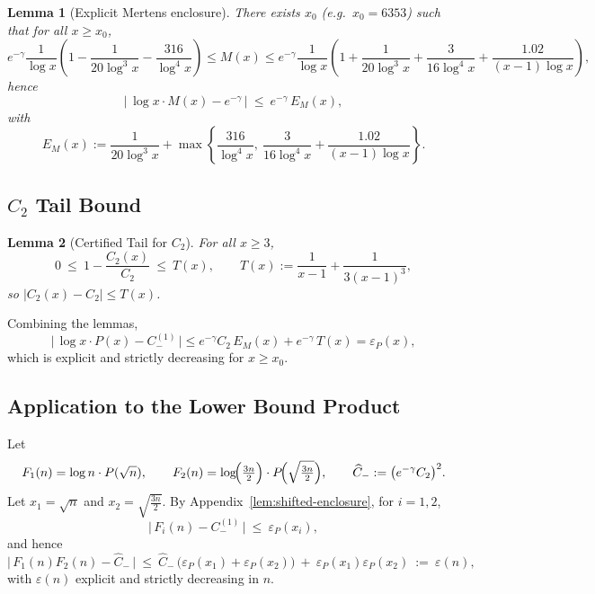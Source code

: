 \documentclass[11pt]{article}
\theoremstyle{inline}
\theoremstyle{break}
\newtheorem{lemma}{Lemma}
\theoremstyle{break}
\theoremstyle{break}
\theoremstyle{break}
\theoremstyle{break}
\theoremstyle{break}
\theoremstyle{break}
\theoremstyle{inline}
\newcommand{\xMertens}{6353} %
\begin{document}
\begin{lemma}[Explicit Mertens enclosure\cite{RosserSchoenfeld1962, Dusart2010}]\label{lem:explicit-mertens}
There exists \( x_0 \) (e.g.\ \( x_0=\xMertens \)) such that for all \( x\ge x_0 \),
\begin{equation}
e^{-\gamma}\frac{1}{\log x}\!\left(1-\frac{1}{20\log^3 x}-\frac{316}{\log^4 x}\right)
\le M(x) \le
e^{-\gamma}\frac{1}{\log x}\!\left(1+\frac{1}{20\log^3 x}+\frac{3}{16\log^4 x}
+\frac{1.02}{(x-1)\log x}\right),
\end{equation}
hence
\begin{equation}
\bigl|\,\log x\cdot M(x)-e^{-\gamma}\,\bigr|\ \le\ e^{-\gamma}\,E_M(x),
\end{equation}
with
\begin{equation}
E_M(x) := \frac{1}{20\log^3 x}+\max\!\left\{\frac{316}{\log^4 x},\ \frac{3}{16\log^4 x}+\frac{1.02}{(x-1)\log x}\right\}.
\end{equation}
\end{lemma}

\subsection{\(C_2\) Tail Bound}\label{app:C2-tail}
\begin{lemma}[Certified Tail for \( C_2 \)]\label{lem:C2-tail}
For all \( x\ge 3 \),
\begin{equation}
0\ \le\ 1-\frac{C_2(x)}{C_2}\ \le\ T(x),
\qquad
T(x) := \frac{1}{x-1}+\frac{1}{3(x-1)^3},
\end{equation}
so \( |C_2(x)-C_2|\le T(x) \).
\end{lemma}

Combining the lemmas,
\begin{equation}
\bigl|\,\log x\cdot P(x) - C_-^{(1)}\,\bigr|
\le e^{-\gamma}C_2\,E_M(x) + e^{-\gamma}\,T(x) = \varepsilon_P(x),
\end{equation}
which is explicit and strictly decreasing for \( x\ge x_0 \).


\subsection{Application to the Lower Bound Product}
Let
\begin{equation}
F_1(n)=\log n\cdot P(\sqrt{n}),\qquad
F_2(n)=\log\!\Bigl(\tfrac{3n}{2}\Bigr)\cdot P\!\Bigl(\sqrt{\tfrac{3n}{2}}\Bigr),
\qquad
\widehat C_- := \bigl(e^{-\gamma}C_2\bigr)^2 .
\end{equation}
Let \(x_1=\sqrt{n}\) and \(x_2=\sqrt{\frac{3n}{2}}\).
By Appendix~\ref{lem:shifted-enclosure}, for \( i=1,2 \),
\begin{equation}
\bigl|\,F_i(n)-C_-^{(1)}\,\bigr|\ \le\ \varepsilon_P(x_i),
\end{equation}
and hence
\begin{equation}
\bigl|\,F_1(n)F_2(n)-\widehat C_-\,\bigr|
\ \le\ \widehat C_-\,\bigl(\varepsilon_P(x_1)+\varepsilon_P(x_2)\bigr)
\ +\ \varepsilon_P(x_1)\varepsilon_P(x_2)
\ :=\ \varepsilon(n),
\end{equation}
with \( \varepsilon(n) \) explicit and strictly decreasing in \( n \).
\end{document}
